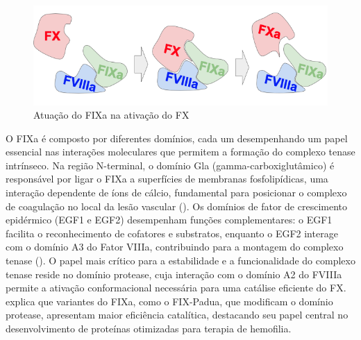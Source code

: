 \begin{figure}[H]
    \centering
    \includegraphics[width=.8\textwidth]{figuras/ativaFX.png}
    \caption{Atuação do FIXa na ativação do FX}
  \end{figure}

O FIXa é composto por diferentes domínios,
cada um desempenhando um papel essencial nas interações moleculares que permitem a formação do complexo tenase intrínseco. 
Na região N-terminal, o domínio Gla (gamma-carboxiglutâmico) é responsável por ligar o FIXa a superfícies de membranas fosfolipídicas, 
uma interação dependente de íons de cálcio, 
fundamental para posicionar o complexo de coagulação no local da lesão vascular (\cite{FIX}). 
Os domínios de fator de crescimento epidérmico (EGF1 e EGF2) desempenham funções complementares: 
o EGF1 facilita o reconhecimento de cofatores e substratos, enquanto o EGF2 interage com o domínio A3 do Fator VIIIa,
contribuindo para a montagem do complexo tenase (\cite{FIX}). 
O papel mais crítico para a estabilidade e a funcionalidade do complexo tenase reside no domínio protease,
cuja interação com o domínio A2 do FVIIIa permite a ativação conformacional necessária para uma catálise eficiente do FX.
\cite{FIX} explica que variantes do FIXa, como o FIX-Padua, que modificam o domínio protease, 
apresentam maior eficiência catalítica, destacando seu papel central no desenvolvimento de proteínas otimizadas para terapia de hemofilia.


